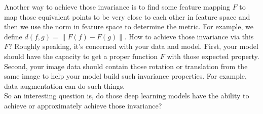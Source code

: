 \indent Another way to achieve those invariance is to find some feature mapping $F$ to map those equivalent points to be very close to each other in feature space and then we use the norm in feature space to determine the metric. For example, we define $d(f,g) = \|F(f)-F(g)\|$. How to achieve those invariance via this $F$? Roughly speaking, it's concerned with your data and model. First, your model should have the capacity to get a proper function $F$ with those expected property. Second, your image data should contain those rotation or translation from the same image to help your model build such invariance properties. For example, data augmentation can  do such things.\\
\indent So an interesting question is, do those deep learning models have the ability to achieve or approximately achieve those invariance?